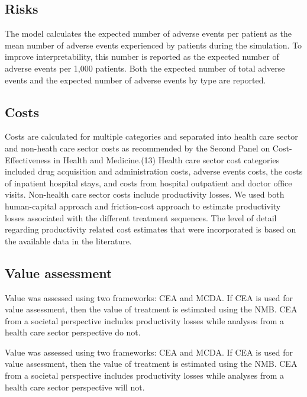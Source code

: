 \documentclass[11pt,final,fleqn]{article}\usepackage[]{graphicx}\usepackage[]{color}
\theoremstyle{plain}
\begin{document}
{\subsection{Risks}

The model calculates the expected number of adverse events per patient as the mean number of adverse events experienced by patients during the simulation. To improve interpretability, this number is reported as the expected number of adverse events per 1,000 patients. Both the expected number of total adverse events and the expected number of adverse events by type are reported.

\subsection{Costs} 

Costs are calculated for multiple categories and separated into health care sector and non-heath care sector costs as recommended by the Second Panel on Cost-Effectiveness in Health and Medicine.(13) Health care sector cost categories included drug acquisition and administration costs, adverse events costs, the costs of inpatient hospital stays, and costs from hospital outpatient and doctor office visits. Non-health care sector costs include productivity losses. We used both human-capital approach and friction-cost approach to estimate productivity losses associated with the different treatment sequences. The level of detail regarding productivity related cost estimates that were incorporated is based on the available data in the literature.

\subsection{Value assessment} 

Value was assessed using two frameworks: CEA and MCDA. If CEA is used for value assessment, then the value of treatment is estimated using the NMB. CEA from a societal perspective includes productivity losses while analyses from a health care sector perspective do not.

Value was assessed using two frameworks: CEA and MCDA. If CEA is used for value assessment, then the value of treatment is estimated using the NMB. CEA from a societal perspective includes productivity losses while analyses from a health care sector perspective will not. 

}
\end{document}
